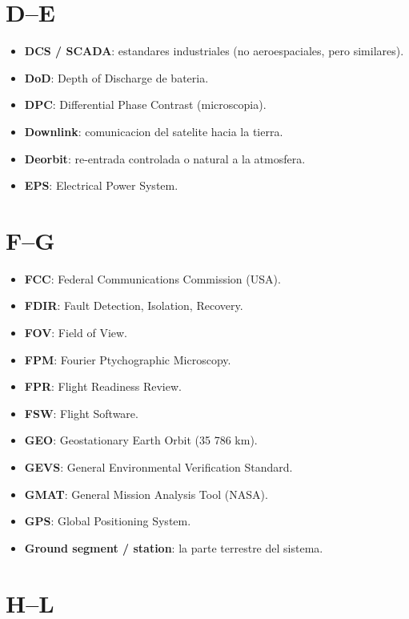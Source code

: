 \documentclass[11pt,a4paper,oneside,openright]{book}
\begin{document}
\section*{D--E}

\begin{itemize}[leftmargin=2em]
  \item \textbf{DCS / SCADA}: estandares industriales (no aeroespaciales,
        pero similares).
  \item \textbf{DoD}: Depth of Discharge de bateria.
  \item \textbf{DPC}: Differential Phase Contrast (microscopia).
  \item \textbf{Downlink}: comunicacion del satelite hacia la tierra.
  \item \textbf{Deorbit}: re-entrada controlada o natural a la atmosfera.
  \item \textbf{EPS}: Electrical Power System.
\end{itemize}

\section*{F--G}

\begin{itemize}[leftmargin=2em]
  \item \textbf{FCC}: Federal Communications Commission (USA).
  \item \textbf{FDIR}: Fault Detection, Isolation, Recovery.
  \item \textbf{FOV}: Field of View.
  \item \textbf{FPM}: Fourier Ptychographic Microscopy.
  \item \textbf{FPR}: Flight Readiness Review.
  \item \textbf{FSW}: Flight Software.
  \item \textbf{GEO}: Geostationary Earth Orbit (35 786 km).
  \item \textbf{GEVS}: General Environmental Verification Standard.
  \item \textbf{GMAT}: General Mission Analysis Tool (NASA).
  \item \textbf{GPS}: Global Positioning System.
  \item \textbf{Ground segment / station}: la parte terrestre del sistema.
\end{itemize}

\section*{H--L}
\end{document}
